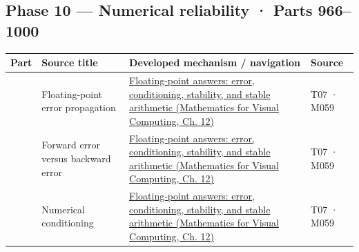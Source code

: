\subsection{Phase 10 --- Numerical reliability · Parts 966--1000}\label{appendix-fd090d982a15-phase-10-numerical-reliability-parts-9661000}

\hypertarget{appendix-fd090d982a15-phase-10-numerical-reliability-parts-9661000}{}

{\def\LTcaptype{none} %
\begin{longtable}[]{@{}
  >{\raggedleft\arraybackslash}p{}
  >{\raggedright\arraybackslash}p{}
  >{\raggedright\arraybackslash}p{}
  >{\raggedright\arraybackslash}p{}@{}}
\toprule\noalign{}
\begin{minipage}[b]{\linewidth}\raggedleft
Part
\end{minipage} & \begin{minipage}[b]{\linewidth}\raggedright
Source title
\end{minipage} & \begin{minipage}[b]{\linewidth}\raggedright
Developed mechanism / navigation
\end{minipage} & \begin{minipage}[b]{\linewidth}\raggedright
Source
\end{minipage} \\
\midrule\noalign{}
\endhead
\bottomrule\noalign{}
\endlastfoot
966 & Floating-point error propagation & \href{../02-Mathematics-for-Visual-Computing/main.pdf\#nameddest=02-foundations-ii-ch028-floating-point-answers-error-conditioning-stability-and-stable-arithmetic}{Floating-point answers: error, conditioning, stability, and stable arithmetic (Mathematics for Visual Computing, Ch. 12)} & T07 · M059 \\
967 & Forward error versus backward error & \href{../02-Mathematics-for-Visual-Computing/main.pdf\#nameddest=02-foundations-ii-ch028-floating-point-answers-error-conditioning-stability-and-stable-arithmetic}{Floating-point answers: error, conditioning, stability, and stable arithmetic (Mathematics for Visual Computing, Ch. 12)} & T07 · M059 \\
968 & Numerical conditioning & \href{../02-Mathematics-for-Visual-Computing/main.pdf\#nameddest=02-foundations-ii-ch028-floating-point-answers-error-conditioning-stability-and-stable-arithmetic}{Floating-point answers: error, conditioning, stability, and stable arithmetic (Mathematics for Visual Computing, Ch. 12)} & T07 · M059 \\

\end{longtable}}
